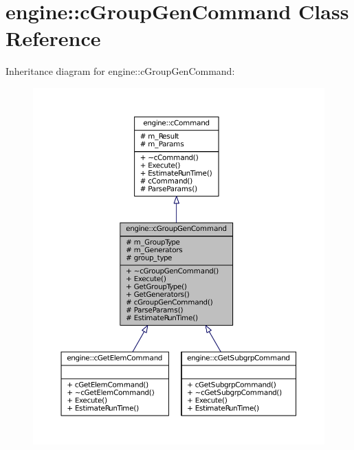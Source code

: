 \hypertarget{classengine_1_1cGroupGenCommand}{
\section{engine\-:\-:c\-Group\-Gen\-Command \-Class \-Reference}
\label{classengine_1_1cGroupGenCommand}
}


\-Inheritance diagram for engine\-:\-:c\-Group\-Gen\-Command\-:\nopagebreak
\begin{figure}[H]
\begin{center}
\leavevmode
\includegraphics[width=350pt]{classengine_1_1cGroupGenCommand__inherit__graph}
\end{center}
\end{figure}


